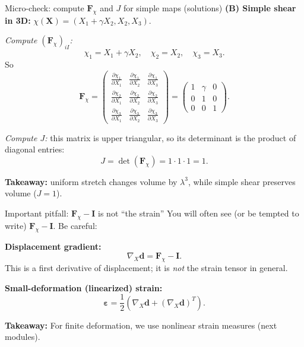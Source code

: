 \documentclass[aspectratio=169]{beamer}
\newcommand{\X}{\bm{X}}
\newcommand{\I}{\bm{I}}
\newcommand{\gradX}{\nabla_{\!X}}
\newcommand{\Fdef}{\bm{F}_{\chi}}  %
\begin{document}
\begin{frame}{Micro-check: compute \(\Fdef\) and \(J\) for simple maps (solutions)}
\medskip
\textbf{(B) Simple shear in 3D:} \(\chi(\X) = (X_1 + \gamma X_2, X_2, X_3)\).

\medskip
\emph{Compute \((\Fdef)_{iI}\):}
\[
\chi_1 = X_1 + \gamma X_2,\quad \chi_2=X_2,\quad \chi_3=X_3.
\]
So
\[
\Fdef=
\begin{pmatrix}
\frac{\partial \chi_1}{\partial X_1} & \frac{\partial \chi_1}{\partial X_2} & \frac{\partial \chi_1}{\partial X_3}\\
\frac{\partial \chi_2}{\partial X_1} & \frac{\partial \chi_2}{\partial X_2} & \frac{\partial \chi_2}{\partial X_3}\\
\frac{\partial \chi_3}{\partial X_1} & \frac{\partial \chi_3}{\partial X_2} & \frac{\partial \chi_3}{\partial X_3}
\end{pmatrix}
=
\begin{pmatrix}
1 & \gamma & 0\\
0 & 1 & 0\\
0 & 0 & 1
\end{pmatrix}.
\]

\emph{Compute \(J\):} this matrix is upper triangular, so its determinant is the product of diagonal entries:
\[
J=\det(\Fdef)=1\cdot 1\cdot 1 = 1.
\]

\medskip
\textbf{Takeaway:} uniform stretch changes volume by \(\lambda^3\), while simple shear preserves volume (\(J=1\)).

\end{frame}


\begin{frame}{Important pitfall: \(\Fdef-\I\) is not ``the strain''}
\small
You will often see (or be tempted to write) \(\Fdef-\I\). Be careful:

\medskip
\textbf{Displacement gradient:}
\[
\gradX \bm{d} = \Fdef - \I.
\]
This is a first derivative of displacement; it is \emph{not} the strain tensor in general.

\medskip
\textbf{Small-deformation (linearized) strain:}
\[
\bm{\varepsilon} = \frac{1}{2}\left(\gradX \bm{d} + (\gradX \bm{d})^{T}\right).
\]

\medskip
\textbf{Takeaway:} For finite deformation, we use nonlinear strain measures (next modules).

\end{frame}
\end{document}
